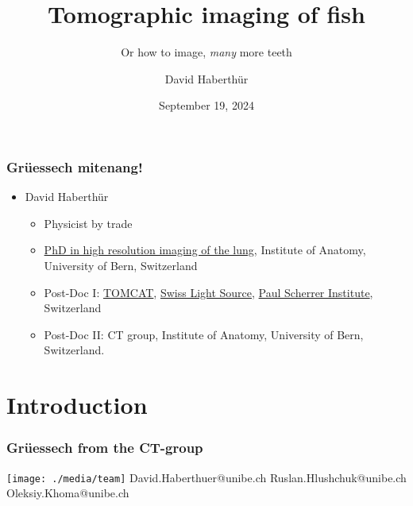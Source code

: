 \documentclass[aspectratio=169,10pt]{beamer}
\title{Tomographic imaging of fish}
\subtitle{Or how to image, \emph{many} more teeth}
\author{David Haberthür}
\institute{Institute of Anatomy}
\date{September 19, 2024}
\newcommand{\imagewidth}{\columnwidth}%
\newcommand{\uct}{{\textmu}CT\xspace}%
\begin{document}
\begin{frame}
	\maketitle
\end{frame}

\begin{frame}
	\frametitle{Grüessech mitenang!}
	\begin{itemize}
		\item David Haberthür
		\begin{itemize}
			\item Physicist by trade
			\item \href{https://boris.unibe.ch/2619/}{PhD in high resolution imaging of the lung}, Institute of Anatomy, University of Bern, Switzerland
			\item Post-Doc I: \href{https://www.psi.ch/sls/tomcat/}{TOMCAT}, \href{https://www.psi.ch/sls/}{Swiss Light Source}, \href{https://www.psi.ch/}{Paul Scherrer Institute}, Switzerland
			\item Post-Doc II: \uct{} group, Institute of Anatomy, University of Bern, Switzerland.
		\end{itemize}
	\end{itemize}
\end{frame}

\section{Introduction}
\begin{frame}
	\frametitle{Grüessech from the \uct-group}
	\centering%
	\texttt{[image: ./media/team]}%
	\hfill%
	David{\color{ubRed}.}Haberthuer{\color{ubRed}@unibe.ch}%
	\hfill%
	Ruslan{\color{ubRed}.}Hlushchuk{\color{ubRed}@unibe.ch}%
	\hfill%
	Oleksiy{\color{ubRed}.}Khoma{\color{ubRed}@unibe.ch}%
	\hfill%
\end{frame}
\end{document}
